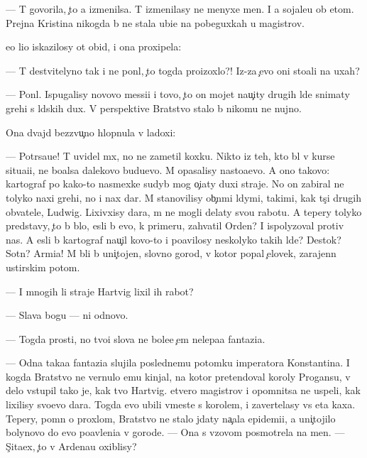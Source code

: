 \documentclass[10pt]{book}
\begin{document}
— T{\yi} govorila, {\c}to {\y}a izmenilsa. T{\yi} izmenilasy ne menyxe men{\ia}. I {\y}a sojale{\y}u ob etom. Prejn{\ia}{\y}a Kristina nikogda b{\yi} ne stala ubi{\y}{\q}e{\y} na pobeguxkah u magistrov.

{\Y}e{\y}o li{\q}o iskazilosy ot obid{\yi}, i ona proxipela:

— T{\yi} de{\y}stvitelyno tak i ne pon{\ia}l, {\c}to togda proizoxlo?! Iz-za {\c}evo oni sto{\y}ali na uxah?

— Pon{\ia}l. Ispugalisy novovo messi{\y}i i tovo, {\c}to on mojet nau{\c}ity drugih l{\iu}de{\y} snimaty grehi s l{\iu}dskih dux. V perspektive Bratstvo stalo b{\yi} nikomu ne nujno.

Ona dvajd{\yi} bezzvu{\c}no hlopnula v ladoxi:

— Potr{\ia}sa{\y}u{\x}e! T{\yi} uvidel m{\yi}x, no ne zametil koxku. Nikto iz teh, kto b{\yi}l v kurse situa{\q}i{\y}i, ne bo{\y}alsa dalekovo budu{\x}evo. M{\yi} opasalisy nasto{\y}a{\x}evo. A ono takovo: kartograf po kako{\y}-to nasmexke sudyb{\yi} mog o{\c}i{\x}aty duxi straje{\y}. No on zabiral ne tolyko naxi grehi, no i nax dar. M{\yi} stanovilisy ob{\yi}{\c}n{\yi}mi l{\iu}dymi, takimi, kak t{\yi}s{\ia}{\c}i drugih ob{\yi}vatele{\y}, Ludwig. Lixivxisy dara, m{\yi} ne mogli delaty svo{\y}u rabotu. A tepery tolyko predstavy, {\c}to b{\yi} b{\yi}lo, {\y}esli b{\yi} {\y}evo, k primeru, zahvatil Orden? I ispolyzoval protiv nas. A {\y}esli b{\yi} kartograf nau{\c}il kovo-to i po{\y}avilosy neskolyko takih l{\iu}de{\y}? Des{\ia}tok? Sotn{\ia}? Armi{\y}a! M{\yi} b{\yi}li b{\yi} uni{\c}tojen{\yi}, slovno gorod, v kotor{\yi}{\y} popal {\c}elovek, zarajenn{\yi}{\y} {\y}ustirskim potom.

— I mnogih li straje{\y} Hartvig lixil ih rabot{\yi}?

— Slava bogu — ni odnovo.

— Togda prosti, no tvo{\y}i slova ne bole{\y}e {\c}em nelepa{\y}a fantazi{\y}a.

— Odna taka{\y}a fantazi{\y}a slujila poslednemu potomku imperatora Konstantina. I kogda Bratstvo ne vernulo {\y}emu kinjal, na kotor{\yi}{\y} pretendoval koroly Progansu, v delo vstupil tako{\y} je, kak tvo{\y} Hartvig. {\C}etvero magistrov i opomnitsa ne uspeli, kak lixilisy svo{\y}evo dara. Togda {\y}evo ubili vmeste s korolem, i zavertelasy vs{\ia} eta kaxa. Tepery, pomn{\ia} o proxlom, Bratstvo ne stalo jdaty na{\c}ala epidemi{\y}i, a uni{\c}tojilo bolynovo do {\y}evo po{\y}avleni{\y}a v gorode. — Ona s v{\yi}zovom posmotrela na men{\ia}. — S{\c}ita{\y}ex, {\c}to v Ardenau oxiblisy?
\end{document}
